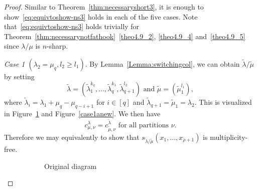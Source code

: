 \documentclass[10pt]{article}
\theoremstyle{definition}
\newenvironment{Case}[1]{\par\vskip2pt\noindent%
\emph{#1}.}{\vskip2pt}
\begin{document}
\begin{proof}
Similar to Theorem~\ref{thm:necessaryshort3}, it is enough to show~\eqref{eq:equivtoshow-ns3} holds in each of the five cases. Note that~\eqref{eq:equivtoshow-ns3} holds trivially for Theorem~\ref{thm:necessarynotfathook}~\ref{theo4.9_2}, \ref{theo4.9_4} and~\ref{theo4.9_5} since $\lambda/\mu$ is $n$-sharp. 

\begin{Case}
{Case 1 $(\lambda_2 = \mu_q, l_2\geq l_1)$} 
By Lemma~\ref{Lemma:switchingcol}, we can obtain $\tilde\lambda/\tilde\mu$ by setting
\[
\tilde\lambda = (\tilde\lambda_1^{k_q}, \ldots,\tilde\lambda_q^{k_1},\tilde\lambda_{q+1}^{l_2})\text{ and }\tilde\mu = (\tilde\mu_1^{l_1}),
\]
where $\tilde\lambda_i = \lambda_1+\mu_q-\mu_{q-i+1}$ for $i\in [q]$ and $\tilde\lambda_{q+1} = \tilde\mu_1 = \lambda_2$. This is visualized in Figure~\ref{case1aoriginal} and Figure~\ref{case1anew}. We then have
\[
c^{\lambda}_{\mu,\nu} = c^{\tilde\lambda}_{\tilde\mu,\nu}\text{ for all partitions }\nu.
\]
Therefore we may equivalently to show that $s_{\tilde\lambda/\tilde\mu}(x_1,\ldots,x_{\rho+1})$ is multiplicity-free.

\begin{figure}[htb]\centering
 \begin{subfigure}{0.4\textwidth}
 \caption{Original diagram}
 \label{case1aoriginal}
 \end{subfigure}
 \hspace{1cm}
 \begin{subfigure}{0.47\textwidth}
\end{subfigure}
\end{figure}
\end{Case}
\end{proof}
\end{document}
